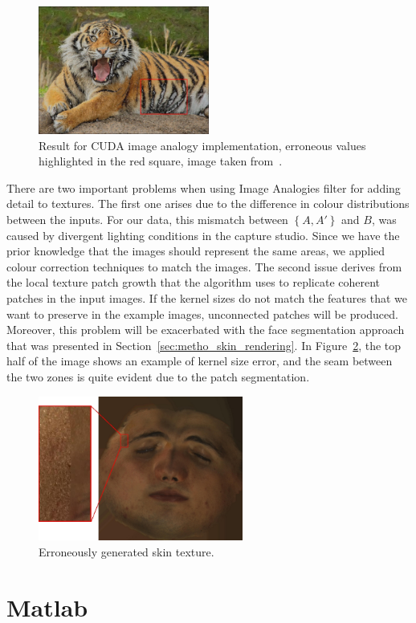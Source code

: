 \begin{figure}[htbp!]
\centering
\includegraphics[width=0.5\textwidth]{img/cuda_error}
	\caption{Result for CUDA image analogy implementation, erroneous values highlighted in the red square, image taken from~\cite{ImAnCudaWeb}.}
	\label{fig:cuda_error}
\end{figure}

There are two important problems when using Image Analogies filter for adding detail to textures.
The first one arises due to the difference in colour distributions between the inputs.
For our data, this mismatch between $\left\lbrace A, A' \right\rbrace$ and $B$, was caused by divergent lighting conditions in the capture studio.
Since we have the prior knowledge that the images should represent the same areas, we applied colour correction techniques to match the images.
The second issue derives from the local texture patch growth that the algorithm uses to replicate coherent patches in the input images.
If the kernel sizes do not match the features that we want to preserve in the example images, unconnected patches will be produced.
Moreover, this problem will be exacerbated with the face segmentation approach that was presented in Section~\ref{sec:metho_skin_rendering}.
In Figure~\ref{fig:skin_patch_error}, the top half of the image shows an example of kernel size error, and the seam between the two zones is quite evident due to the patch segmentation.

\begin{figure}[htbp!]
\centering
\includegraphics[width=0.6\textwidth]{img/skin_patch_error}
	\caption{Erroneously generated skin texture.}
	\label{fig:skin_patch_error}
\end{figure}


\section{Matlab}

